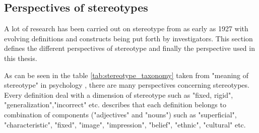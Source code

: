 \subsection{Perspectives of stereotypes}
A lot of research has been carried out on stereotype from as early as 1927 with evolving definitions and constructs being put forth by investigators. This section defines the different perspectives of stereotype and finally the perspective used in this thesis.

As can be seen in the table \ref{tab:stereotype_taxonomy} taken from "meaning of stereotype" in psychology \cite{ashmore1981conceptual}, there are many perspectives concerning stereotypes. Every definition deal with a dimension of stereotype  such as "fixed, rigid", "generalization","incorrect" etc. \cite{kanahara2006review} describes that each definition belongs to combination of components ("adjectives" and "nouns") such as "superficial", "characteristic", "fixed", "image", "impression", "belief", "ethnic", "cultural" etc.  

